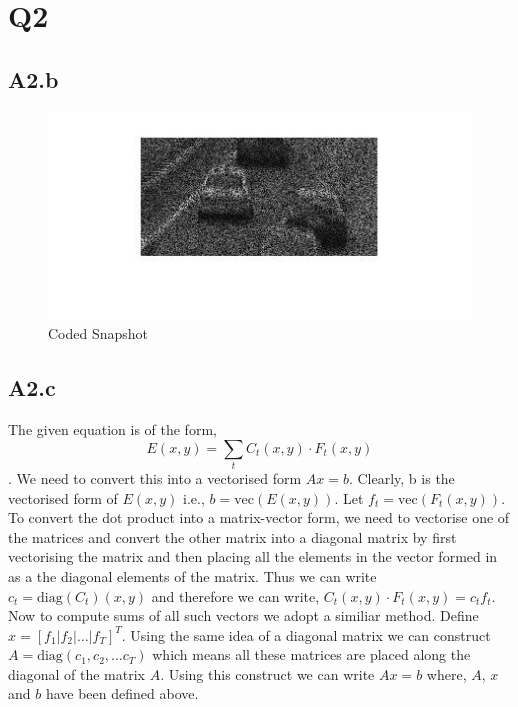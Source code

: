 \documentclass{article}
\begin{document}



\section*{Q2}

\subsection*{A2.b}

\begin{figure}
\centering
\includegraphics{codedSnapshot}
\caption{Coded Snapshot}
\label{Fig: 2b}
\end{figure}


\subsection*{A2.c}

The given equation is of the form, $$ E(x,y) = \sum_{t} C_t(x,y) \cdot F_t(x,y) $$. We need to convert this into a vectorised form $Ax = b$. Clearly, b is the vectorised form of $E(x,y)$ i.e., $b = \text{vec}(E(x,y))$. Let $f_t = \text{vec}(F_t(x,y))$. To convert the dot product into a matrix-vector form, we need to vectorise one of the matrices and convert the other matrix into a diagonal matrix by first vectorising the matrix and then placing all the elements in the vector formed in as a the diagonal elements of the matrix. Thus we can write $c_t = \text{diag}(C_t)(x,y)$ and therefore we can write, $ C_t(x,y) \cdot F_t(x,y) = c_t f_t $. Now to compute sums of all such vectors we adopt a similiar method. Define $x = [f_1 | f_2 | \dots |f_T ]^T$. Using the same idea of a diagonal matrix we can construct $ A = \text{diag}(c_1, c_2, \dots c_T) $ which means all these matrices are placed along the diagonal of the matrix $A$. Using this construct we can write $Ax = b$ where, $A$, $x$ and $b$ have been defined above.
\end{document}
